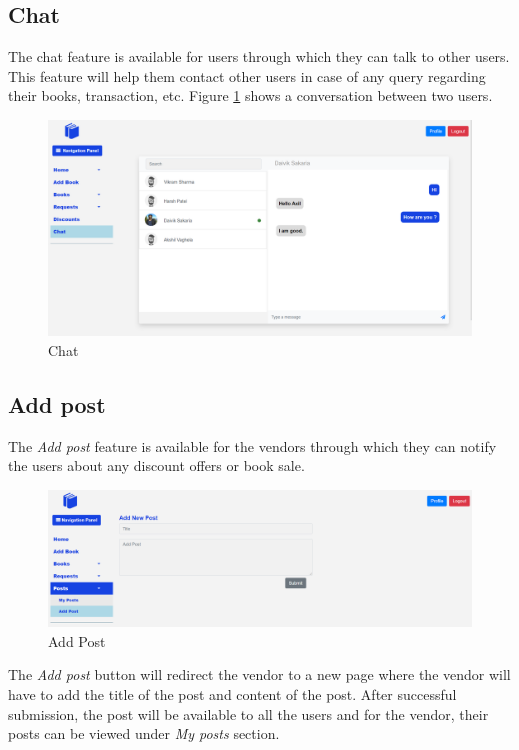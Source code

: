 \documentclass[conference]{IEEEtran}
\begin{document}
\subsection{Chat}
The chat feature is available for users through which they can talk to other users. This feature will help them contact other users in case of any query regarding their books, transaction, etc. Figure \ref{fig:chat} shows a conversation between two users.
\begin{figure}[h]
     \centering
     \includegraphics[scale=0.20,margin=2,frame]{chat.PNG}
     \caption{Chat}
     \label{fig:chat}
 \end{figure}

\subsection{Add post}
The \emph{Add post} feature is available for the vendors through which they can notify the users about any discount offers or book sale. 
\begin{figure}[h]
     \centering
     \includegraphics[scale=0.20,margin=2,frame]{addpost.PNG}
     \caption{Add Post}
     \label{fig:addpost}
 \end{figure}
The \emph{Add post} button will redirect the vendor to a new page where the vendor will have to add the title of the post and content of the post. After successful submission, the post will be available to all the users and for the vendor, their posts can be viewed under \emph{My posts} section. 
\end{document}
